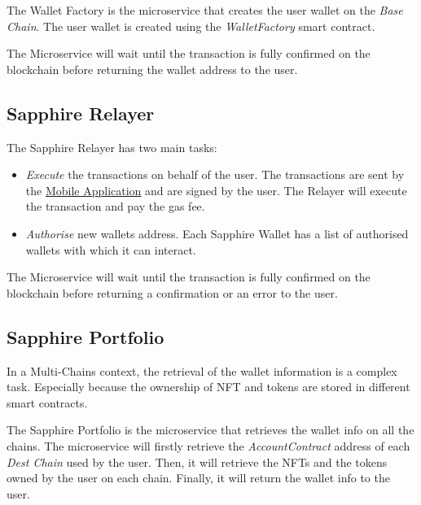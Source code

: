 The Wallet Factory is the microservice that creates the user wallet on the \textit{Base Chain}. The user wallet is created using the \textit{WalletFactory} smart contract.  

The Microservice will wait until the transaction is fully confirmed on the blockchain before returning the wallet address to the user.

\subsection{Sapphire Relayer}
\label{subsec:sapphire_relayer}

The Sapphire Relayer has two main tasks:

\begin{itemize}
    \item \textit{Execute} the transactions on behalf of the user. The transactions are sent by the \hyperref[sec:mobile_application]{Mobile Application} and are signed by the user. The Relayer will execute the transaction and pay the gas fee.
    \item \textit{Authorise} new wallets address. Each Sapphire Wallet has a list of authorised wallets with which it can interact.
\end{itemize}

The Microservice will wait until the transaction is fully confirmed on the blockchain before returning a confirmation or an error to the user.

\subsection{Sapphire Portfolio}
\label{subsec:sapphire_portfolio}

In a Multi-Chains context, the retrieval of the wallet information is a complex task. Especially because the ownership of NFT and tokens are stored in different smart contracts.

The Sapphire Portfolio is the microservice that retrieves the wallet info on all the chains. The microservice will firstly retrieve the \textit{AccountContract} address of each \textit{Dest Chain} used by the user. Then, it will retrieve the NFTs and the tokens owned by the user on each chain. Finally, it will return the wallet info to the user.